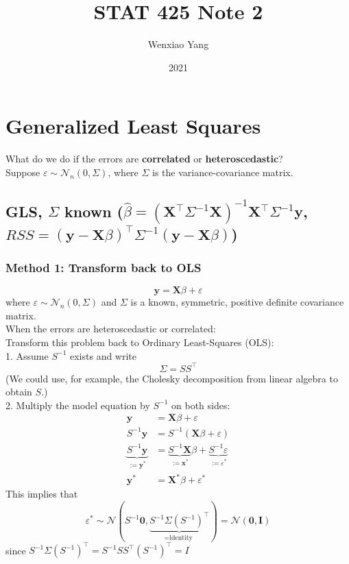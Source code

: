 \documentclass[11pt,a4paper]{article}
\title{STAT 425 Note 2}
\author[*]{Wenxiao Yang}
\affil[*]{Department of Mathematics, University of Illinois at Urbana-Champaign}
\date{2021}
\begin{document}
\maketitle
\tableofcontents
\newpage




\section{Generalized Least Squares}
What do we do if the errors are \textbf{correlated} or \textbf{heteroscedastic}?\\
Suppose $\varepsilon \sim \mathcal{N}_{n}(0, \Sigma)$, where $\Sigma$ is the variance-covariance matrix.
\subsection{GLS, $\Sigma$ known ($\hat{\beta}=\left(\mathbf{X}^{\top} \Sigma^{-1} \mathbf{X}\right)^{-1} \mathbf{X}^{\top} \Sigma^{-1} \mathbf{y}$, ${RSS}=(\mathbf{y}-\mathbf{X} \beta)^{\top} \Sigma^{-1}(\mathbf{y}-\mathbf{X} \beta)$)}
\subsubsection{Method 1: Transform back to OLS}
$$
\mathbf{y}=\mathbf{X} \beta+\varepsilon
$$
where $\varepsilon \sim \mathcal{N}_{n}(0, \Sigma)$ and $\Sigma$ is a known, symmetric, positive definite covariance matrix.\\
When the errors are heteroscedastic or correlated:\\
Transform this problem back to Ordinary Least-Squares (OLS):\\
1. Assume $S^{-1}$ exists and write
$$
\Sigma=S S^{\top}
$$
(We could use, for example, the Cholesky decomposition from linear algebra to obtain $S$.)\\

2. Multiply the model equation by $S^{−1}$ on both sides:
$$
\begin{aligned}
\mathbf{y} &=\mathbf{X} \beta+\varepsilon \\
S^{-1} \mathbf{y} &=S^{-1}(\mathbf{X} \beta+\varepsilon) \\
\underbrace{S^{-1} \mathbf{y}}_{:=\mathbf{y}^{*}} &=\underbrace{S^{-1} \mathbf{X}}_{:=\mathbf{x}^{*}} \beta+\underbrace{S^{-1} \varepsilon}_{:=\varepsilon^{*}} \\
\mathbf{y}^{*} &=\mathbf{X}^{*} \beta+\varepsilon^{*}
\end{aligned}
$$
This implies that
$$
\varepsilon^{*} \sim \mathcal{N}(S^{-1} \mathbf{0}, \underbrace{S^{-1} \Sigma\left(S^{-1}\right)^{\top}}_{=\text {ldentity }})=\mathcal{N}(\mathbf{0}, \mathbf{I})
$$
since $S^{-1} \Sigma\left(S^{-1}\right)^{\top}=S^{-1} S S^{\top}\left(S^{-1}\right)^{\top}=I$\\
\end{document}

